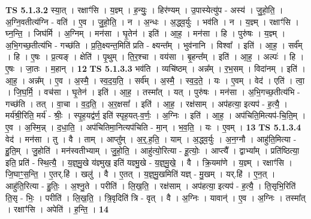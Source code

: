 \documentclass[17pt]{extarticle}
\begin{document}
                  \newline
                                \textbf{ TS 5.1.3.2} \newline
                  स्या॒त् । रक्षाꣳ॑सि । य॒ज्ञ्म् । ह॒न्युः॒ । हिर॑ण्यम् । उ॒पास्येत्यु॑प - अस्य॑ । जु॒हो॒ति॒ । अ॒ग्नि॒वतीत्य॑ग्नि - वति॑ । ए॒व । जु॒हो॒ति॒ । न । अ॒न्धः । अ॒द्ध्व॒र्युः । भव॑ति । न । य॒ज्ञ्म् । रक्षाꣳ॑सि । घ्न॒न्ति॒ । जिघ॑र्मि । अ॒ग्निम् । मन॑सा । घृ॒तेन॑ । इति॑ । आ॒ह॒ । मन॑सा । हि । पुरु॑षः । य॒ज्ञ्म् । अ॒भि॒गच्छ॒तीत्य॑भि - गच्छ॑ति । प्र॒ति॒क्ष्यन्त॒मिति॑ प्रति - क्ष्यन्त᳚म् । भुव॑नानि । विश्वा᳚ । इति॑ । आ॒ह॒ । सर्व᳚म् । हि । ए॒षः । प्र॒त्यङ् । क्षेति॑ । पृ॒थुम् । ति॒र॒श्चा । वय॑सा । बृ॒हन्त᳚म् । इति॑ । आ॒ह॒ । अल्पः॑ । हि । ए॒षः । जा॒तः । म॒हान् । \textbf{  12} \newline
                  \newline
                                \textbf{ TS 5.1.3.3} \newline
                  भव॑ति । व्यचि॑ष्ठम् । अन्न᳚म् । र॒भ॒सम् । विदा॑नम् । इति॑ । आ॒ह॒ । अन्न᳚म् । ए॒व । अ॒स्मै॒ । स्व॒द॒य॒ति॒ । सर्व᳚म् । अ॒स्मै॒ । स्व॒द॒ते॒ । यः । ए॒वम् । वेद॑ । एति॑ । त्वा॒ । जि॒घ॒र्मि॒ । वच॑सा । घृ॒तेन॑ । इति॑ । आ॒ह॒ । तस्मा᳚त् । यत् । पुरु॑षः । मन॑सा । अ॒भि॒गच्छ॒तीत्य॑भि - गच्छ॑ति । तत् । वा॒चा । व॒द॒ति॒ । अ॒र॒क्षसा᳚ । इति॑ । आ॒ह॒ । रक्ष॑साम् । अप॑हत्या॒ इत्यप॑ - ह॒त्यै॒ । मर्य॑श्री॒रिति॒ मर्य॑ - श्रीः॒ । स्पृ॒ह॒यद्व॑र्ण॒ इति॑ स्पृह॒यत्-व॒र्णः॒ । अ॒ग्निः । इति॑ । आ॒ह॒ । अप॑चिति॒मित्यप॑-चि॒ति॒म् । ए॒व । अ॒स्मि॒न्न् । द॒धा॒ति॒ । अप॑चितिमा॒नित्यप॑चिति - मा॒न् । भ॒व॒ति॒ । यः । ए॒वम् । \textbf{  13} \newline
                  \newline
                                \textbf{ TS 5.1.3.4} \newline
                  वेद॑ । मन॑सा । तु । वै । ताम् । आप्तु᳚म् । अ॒र्॒.ह॒ति॒ । याम् । अ॒द्ध्व॒र्युः । अ॒न॒ग्नौ । आहु॑ति॒मित्या - हु॒ति॒म् । जु॒होति॑ । मन॑स्वतीभ्याम् । जु॒हो॒ति॒ । आहु॑त्यो॒रित्या - हू॒त्योः॒ । आप्त्यै᳚ । द्वाभ्या᳚म् । प्रति॑ष्ठित्या॒ इति॒ प्रति॑ - स्थि॒त्यै॒ । य॒ज्ञ्॒मु॒खे य॑ज्ञ्मुख॒ इति॑ यज्ञ्मु॒खे - य॒ज्ञ्॒मु॒खे॒ । वै । क्रि॒यमा॑णे । य॒ज्ञ्म् । रक्षाꣳ॑सि । जि॒घाꣳ॒॒स॒न्ति॒ । ए॒तर्.हि॑ । खलु॑ । वै । ए॒तत् । य॒ज्ञ्॒मु॒खमिति॑ यज्ञ् - मु॒खम् । यर्.हि॑ । ए॒न॒त् । आहु॑ति॒रित्या - हु॒तिः॒ । अ॒श्नु॒ते । परीति॑ । लि॒ख॒ति॒ । रक्ष॑साम् । अप॑हत्या॒ इत्यप॑ - ह॒त्यै॒ । ति॒सृभि॒रिति॑ ति॒सृ - भिः॒ । परीति॑ । लि॒ख॒ति॒ । त्रि॒वृदिति॑ त्रि - वृत् । वै । अ॒ग्निः । यावान्॑ । ए॒व । अ॒ग्निः । तस्मा᳚त् । रक्षाꣳ॑सि । अपेति॑ । ह॒न्ति॒ । \textbf{  14} \newline
\end{document}
